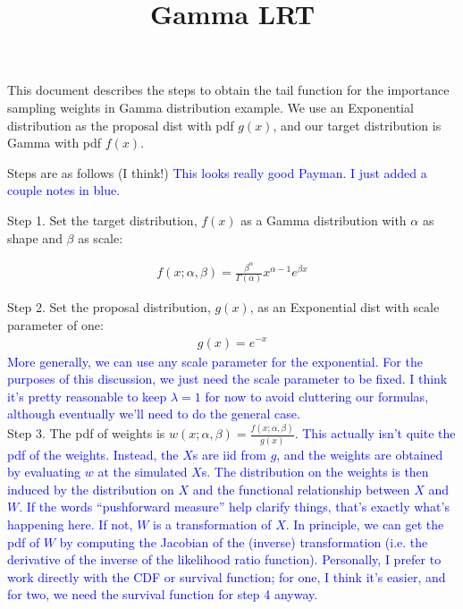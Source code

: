 \documentclass{article}
\title{Gamma LRT}
\date{}
\begin{document}
\maketitle

This document describes the steps to obtain the tail function for the importance sampling weights in Gamma distribution example. 
We use an Exponential distribution as the proposal dist with pdf $g(x)$, and our target distribution is Gamma with pdf $f(x)$.

Steps are as follows (I think!)
\textcolor{blue}{This looks really good Payman. I just added a couple notes in blue.}

Step 1. Set the target distribution, $f(x)$ as a Gamma distribution with $\alpha$ as shape and $\beta$ as scale:

\begin{align}
    f(x;\alpha,\beta) = \frac{\beta^{\alpha}}{\Gamma(\alpha)} x^{\alpha-1} e^{\beta x}
\end{align}

Step 2. Set the proposal distribution, $g(x)$, as an Exponential dist with scale parameter of one:
\begin{align}
    g(x) = e^{-x}
\end{align}
\textcolor{blue}{More generally, we can use any scale parameter for the exponential. For the purposes of this discussion, we just need the scale parameter to be fixed. I think it's pretty reasonable to keep $\lambda=1$ for now to avoid cluttering our formulas, although eventually we'll need to do the general case.}\\

Step 3. The pdf of weights is $w(x;\alpha,\beta) = \frac{f(x;\alpha,\beta)}{g(x)}$. \textcolor{blue}{This actually isn't quite the pdf of the weights. Instead, the $X$s are iid from $g$, and the weights are obtained by evaluating $w$ at the simulated $X$s. The distribution on the weights is then induced by the distribution on $X$ and the functional relationship between $X$ and $W$. If the words ``pushforward measure'' help clarify things, that's exactly what's happening here. If not, $W$ is a transformation of $X$. In principle, we can get the pdf of $W$ by computing the Jacobian of the (inverse) transformation (i.e. the derivative of the inverse of the likelihood ratio function). Personally, I prefer to work directly with the CDF or survival function; for one, I think it's easier, and for two, we need the survival function for step 4 anyway.}\\
\end{document}
